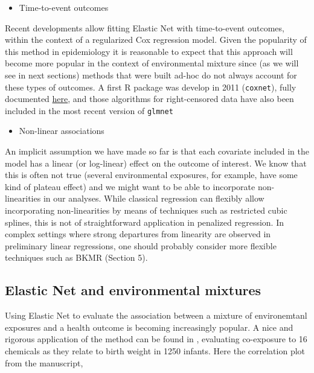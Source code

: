\documentclass[
]{book}
\providecommand{\tightlist}{%
  \setlength{\itemsep}{0pt}\setlength{\parskip}{0pt}}
\begin{document}
\begin{itemize}
\tightlist
\item
  Time-to-event outcomes
\end{itemize}

Recent developments allow fitting Elastic Net with time-to-event outcomes, within the context of a regularized Cox regression model. Given the popularity of this method in epidemiology it is reasonable to expect that this approach will become more popular in the context of environmental mixture since (as we will see in next sections) methods that were built ad-hoc do not always account for these types of outcomes. A first R package was develop in 2011 (\texttt{coxnet}), fully documented \href{https://cran.r-project.org/web/packages/glmnet/vignettes/Coxnet.pdf}{here}, and those algorithms for right-censored data have also been included in the most recent version of \texttt{glmnet}

\begin{itemize}
\tightlist
\item
  Non-linear associations
\end{itemize}

An implicit assumption we have made so far is that each covariate included in the model has a linear (or log-linear) effect on the outcome of interest. We know that this is often not true (several environmental exposures, for example, have some kind of plateau effect) and we might want to be able to incorporate non-linearities in our analyses. While classical regression can flexibly allow incorporating non-linearities by means of techniques such as restricted cubic splines, this is not of straightforward application in penalized regression. In complex settings where strong departures from linearity are observed in preliminary linear regressions, one should probably consider more flexible techniques such as BKMR (Section 5).

\hypertarget{elastic-net-and-environmental-mixtures}{%
\subsection{Elastic Net and environmental mixtures}\label{elastic-net-and-environmental-mixtures}}

Using Elastic Net to evaluate the association between a mixture of environemtanl exposures and a health outcome is becoming increasingly popular. A nice and rigorous application of the method can be found in \citet{lenters2016prenatal}, evaluating co-exposure to 16 chemicals as they relate to birth weight in 1250 infants. Here the correlation plot from the manuscript,
\end{document}
